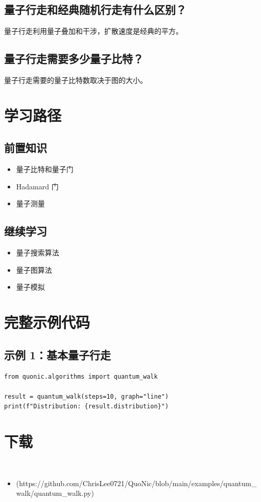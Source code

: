 \documentclass[12pt,a4paper]{article}
\begin{document}
\subsection{量子行走和经典随机行走有什么区别？}

量子行走利用量子叠加和干涉，扩散速度是经典的平方。

\subsection{量子行走需要多少量子比特？}

量子行走需要的量子比特数取决于图的大小。

\section{学习路径}

\subsection{前置知识}
\begin{itemize}
  \item 量子比特和量子门
  \item Hadamard 门
  \item 量子测量
\end{itemize}

\subsection{继续学习}
\begin{itemize}
  \item 量子搜索算法
  \item 量子图算法
  \item 量子模拟
\end{itemize}

\section{完整示例代码}

\subsection{示例 1：基本量子行走}

\begin{lstlisting}[style=python]
from quonic.algorithms import quantum_walk

result = quantum_walk(steps=10, graph="line")
print(f"Distribution: {result.distribution}")
\end{lstlisting}


\section{下载}

\begin{itemize}
  \item [quantum_walk.py](https://github.com/ChrisLee0721/QuoNic/blob/main/examples/quantum_walk/quantum_walk.py)
\end{itemize}
\end{document}
